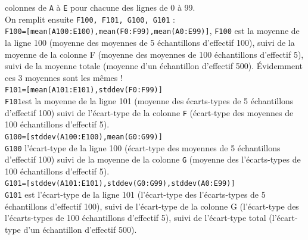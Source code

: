 \documentclass[a4paper,11pt]{book}
\begin{document}
 colonnes 
de {\tt A} \`a {\tt E} pour chacune des lignes de 0 \`a 99.\\
On remplit ensuite {\tt F100, F101, G100, G101} :\\
{\tt F100=[mean(A100:E100),mean(F0:F99),mean(A0:E99)]}, {\tt F100} est 
la moyenne de la ligne 100 (moyenne des moyennes de 5 \'echantillons 
d'effectif 100), suivi de la moyenne de la colonne F 
(moyenne des moyennes de 100 \'echantillons d'effectif 5), suivi de la
 moyenne totale (moyenne d'un \'echantillon
d'effectif 500). \'Evidemment ces 3 moyennes sont les m\^emes !\\
{\tt F101=[mean(A101:E101),stddev(F0:F99)]}\\
 {\tt F101}est la moyenne de la ligne 
101 (moyenne des \'ecarts-types de 5 
\'echantillons d'effectif 100) suivi de l'\'ecart-type de la colonne {\tt F}
(\'ecart-type des moyennes de 100 \'echantillons d'effectif 5).\\
{\tt G100=[stddev(A100:E100),mean(G0:G99)]}\\
{\tt G100} l'\'ecart-type de la 
ligne 100 (\'ecart-type des moyennes de 5 \'echantillons d'effectif 100) suivi de la moyenne de la colonne {\tt G} (moyenne des l'\'ecarts-types de 100 
\'echantillons d'effectif 5).\\
{\tt G101=[stddev(A101:E101),stddev(G0:G99),stddev(A0:E99)]}\\
 {\tt G101}
est l'\'ecart-type de la ligne 101 (l'\'ecart-type des l'\'ecarts-types de 5 
\'echantillons d'effectif 100), suivi de l'\'ecart-type de la colonne G 
(l'\'ecart-type des l'\'ecarts-types de 100 \'echantillons d'effectif 5), 
suivi de l'\'ecart-type  total (l'\'ecart-type  d'un \'echantillon
d'effectif 500).
\end{document}
